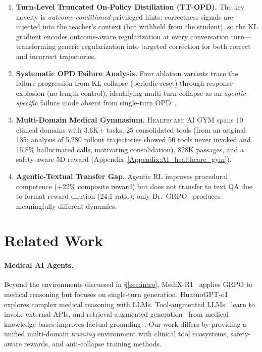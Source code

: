\documentclass{article}
\newcommand{\gym}{\textsc{Healthcare AI GYM}}
\begin{document}
\begin{enumerate}[leftmargin=*,itemsep=1pt,topsep=2pt]
    \item \textbf{Turn-Level Truncated On-Policy Distillation (TT-OPD).} The key novelty is \emph{outcome-conditioned} privileged hints: correctness signals are injected into the teacher's context (but withheld from the student), so the KL gradient encodes outcome-aware regularization at every conversation turn---transforming generic regularization into targeted correction for both correct and incorrect trajectories.

    \item \textbf{Systematic OPD Failure Analysis.} Four ablation variants trace the failure progression from KL collapse (periodic reset) through response explosion (no length control), identifying multi-turn collapse as an \emph{agentic-specific} failure mode absent from single-turn OPD~\citep{yang26rlsd, zhao26opsd}.

    \item \textbf{Multi-Domain Medical Gymnasium.} \gym{} spans 10 clinical domains with 3.6K+ tasks, 25 consolidated tools (from an original 135; analysis of 5,280 rollout trajectories showed 50 tools never invoked and 15.8\% hallucinated calls, motivating consolidation), 828K passages, and a safety-aware 5D reward (Appendix~\ref{Appendix:AI_healthcare_gym}).

    \item \textbf{Agentic-Textual Transfer Gap.} Agentic RL improves procedural competence (+22\% composite reward) but does not transfer to text QA due to format reward dilution (24:1 ratio); only Dr.~GRPO~\citep{liu2025drgrpo} produces meaningfully different dynamics.
\end{enumerate}

\section{Related Work}
\label{sec:related}

\paragraph{Medical AI Agents.}
Beyond the environments discussed in \S\ref{sec:intro}, MediX-R1~\citep{medixr1} applies GRPO to medical reasoning but focuses on single-turn generation. HuatuoGPT-o1~\citep{chen2024huatuogpt} explores complex medical reasoning with LLMs. Tool-augmented LLMs~\citep{schick2024toolformer, qin2023toolllm} learn to invoke external APIs, and retrieval-augmented generation~\citep{lewis2020rag} from medical knowledge bases improves factual grounding~\citep{xiong2024medcpt}. Our work differs by providing a unified multi-domain \emph{training} environment with clinical tool ecosystems, safety-aware rewards, and anti-collapse training methods.
\end{document}
